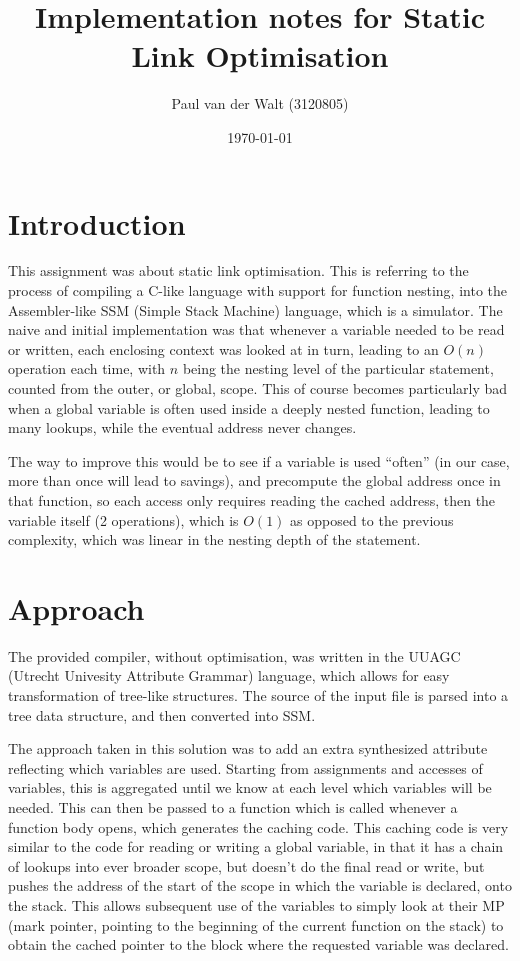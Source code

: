 \documentclass[a4paper]{article}
\author{Paul van der Walt (3120805)}
\date{\today}
\title{Implementation notes for Static Link Optimisation}
\begin{document}
\maketitle
\tableofcontents

\section{Introduction}

This assignment was about static link optimisation. This is referring to the process of compiling a C-like language with support for function nesting, into the Assembler-like SSM (Simple Stack Machine) language, which is a simulator. 
The naive and initial implementation was that whenever a variable needed to be read or written, each enclosing context was looked at in turn, leading to an $O(n)$ operation each time, with $n$ being
the nesting level of the particular statement, counted from the outer, or global, scope. This of course becomes particularly bad when a global variable is often used inside a deeply nested function, leading to many lookups, while the eventual address never changes.

The way to improve this would be to see if a variable is used ``often'' (in our case, more than once will lead to savings), and precompute the global address once in that function, so each access only requires reading the cached address, then the variable itself (2 operations), which is $O(1)$ as opposed to the previous complexity, which was linear in the nesting depth of the statement. 

\section{Approach}

The provided compiler, without optimisation, was written in the UUAGC (Utrecht Univesity Attribute Grammar) language, which allows for easy transformation of tree-like structures. The source of the input file is parsed into a tree data structure, and 
then converted into SSM. 

The approach taken in this solution was to add an extra synthesized attribute reflecting which variables are used. Starting from assignments and accesses of variables, this is aggregated until we know at each level which variables will be needed. This can then
be passed to a function which is called whenever a function body opens, which generates the caching code. This caching code is very similar to the code for reading or writing a global variable, in that it has a chain of lookups into ever broader scope, but doesn't
do the final read or write, but pushes the address of the start of the scope in which the variable is declared, onto the stack. This allows subsequent use of the variables to simply look at their MP (mark pointer, pointing to the beginning of the current function on 
the stack) to obtain the cached pointer to the block where the requested variable was declared. 
\end{document}

